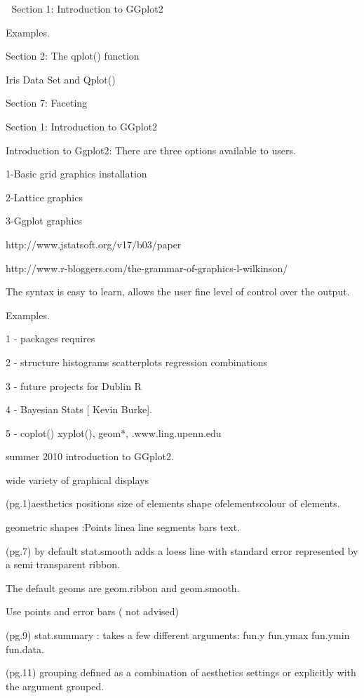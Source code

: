 

Section 1: Introduction to GGplot2

Examples.

Section 2: The qplot() function

Iris Data Set and Qplot()

Section 7: Faceting

Section 1: Introduction to GGplot2


Introduction to Ggplot2: There are three options available to users.


1-Basic grid graphics installation

2-Lattice graphics

3-Ggplot graphics






http://www.jstatsoft.org/v17/b03/paper

http://www.r-bloggers.com/the-grammar-of-graphics-l-wilkinson/


The syntax is easy to learn, allows the user fine level of control over the output.

Examples.


1 - packages requires

2 - structure histograms scatterplots regression combinations

3 - future projects for Dublin R

4 - Bayesian Stats [ Kevin Burke].

5 - coplot() xyplot(), geom*, .www.ling.upenn.edu 

summer 2010 introduction to GGplot2.


wide variety of graphical displays 


(pg.1)aesthetics positions size of elements shape ofelementscolour of elements.

geometric shapes :Points linea line segments bars text.


(pg.7) by default stat.smooth adds a loess line with standard error represented by a semi transparent ribbon.

The default geoms are geom.ribbon and geom.smooth.


Use points and error bars ( not advised)

(pg.9) stat.summary : takes a few different arguments: fun.y fun.ymax fun.ymin fun.data.


(pg.11) grouping defined as a combination of aesthetics settings or explicitly with the argument grouped.

